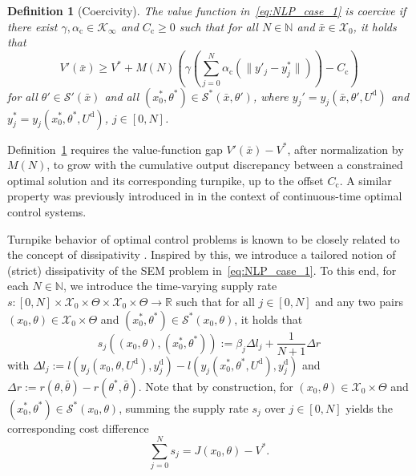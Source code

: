 \documentclass[a4paper,fleqn]{cas-dc}
\newtheorem{defn}{Definition}
\begin{document}
\begin{defn}[Coercivity]\label{def:coerc}
	The value function in~\eqref{eq:NLP_case_1} is \emph{coercive} if there exist $\gamma,\alpha_\mathrm{c}\in\mathcal{K}_\infty$ and $C_\mathrm{c}\geq0$ such that for all $N\in\mathbb{N}$ and $\bar{x}\in\mathcal{X}_0$, it holds that
	\begin{equation}\label{eq:coerc}
		V'(\bar{x}) \geq V^* + M(N)\left(\gamma\left( \sum_{j=0}^{N} \alpha_\mathrm{c}(\|y'_j - y^*_j\|)\right) - C_\mathrm{c}\right)
	\end{equation}
	for all $\theta'\in\mathcal{S}'(\bar{x})$ and all $(x_0^*,\theta^*)\in \mathcal{S}^*(\bar{x},\theta')$, where $y_j' = y_j(\bar{x},\theta',U^\mathrm{d})$ and $y_j^* = y_j(x_0^*,\theta^*,U^\mathrm{d})$, $j\in[0,N]$.
\end{defn}

Definition~\ref{def:coerc} requires the value-function gap $V'(\bar{x})-V^*$, after normalization by $M(N)$, to grow with the cumulative output discrepancy between a constrained optimal solution and its corresponding turnpike, up to the offset $C_\mathrm{c}$. A similar property was previously introduced in \cite[Ass.~\textit{H}\textsubscript{4}]{Trelat2018a} in the context of continuous-time optimal control systems.

Turnpike behavior of optimal control problems is known to be closely related to the concept of dissipativity \cite{Trelat2025,Faulwasser2022,Gruene2018,Gruene2016a}. Inspired by this, we introduce a tailored notion of (strict) dissipativity of the SEM problem in~\eqref{eq:NLP_case_1}. To this end, for each $N\in\mathbb{N}$, we introduce the time-varying supply rate $s:[0,N]\times\mathcal{X}_0\times\Theta\times\mathcal{X}_0\times\Theta\rightarrow\mathbb{R}$ such that for all $j\in[0,N]$ and any two pairs $(x_0,\theta)\in\mathcal{X}_0\times\Theta$ and $(x_0^*,\theta^*)\in\mathcal{S}^*(x_0,\theta)$, it holds that
\begin{equation}
	s_j((x_0,\theta),(x_0^*,\theta^*)):= \beta_j \Delta l_j + \frac{1}{N+1}\Delta r \label{eq:diss_supply}
\end{equation}
with $\Delta l_j := l(y_j(x_0,\theta,U^\mathrm{d}),{y}_{j}^\mathrm{d}) - l(y_j(x_0^*,\theta^*,U^\mathrm{d}),{y}_{j}^\mathrm{d})$ and $\Delta r := r(\theta,\bar{\theta}) - r(\theta^*,\bar{\theta})$.
Note that by construction, for $(x_0,\theta)\in\mathcal{X}_0\times\Theta$ and $(x_0^*,\theta^*)\in\mathcal{S}^*(x_0,\theta)$, summing the supply rate $s_j$ over $j\in[0,N]$ yields the corresponding cost difference
\begin{equation}\label{eq:supply_value}
	\sum_{j=0}^{N}s_j = J(x_0,\theta)-V^*.
\end{equation}
\end{document}

